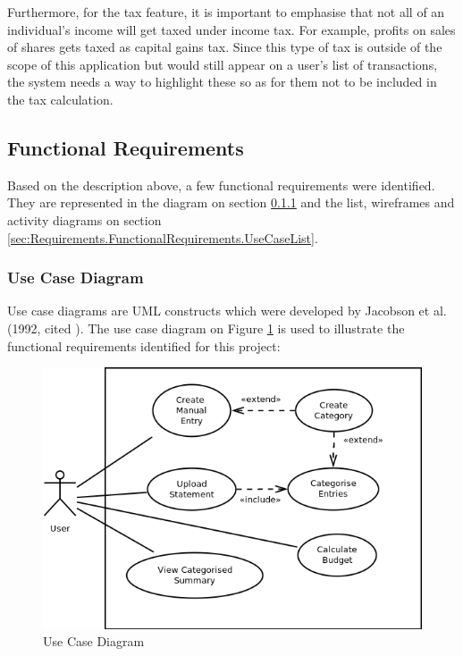 Furthermore, for the tax feature, it is important to emphasise that not all of
an individual's income will get taxed under income tax. For example, profits on
sales of shares gets taxed as capital gains tax. Since this type of tax is
outside of the scope of this application but would still appear on a user's
list of transactions, the system needs a way to highlight these so as for them
not to be included in the tax calculation.


\subsection{Functional Requirements} \label{sec:Requirements.FunctionalRequirements}

Based on the description above, a few functional requirements were identified.
They are represented in the diagram on section
\ref{sec:Requirements.FunctionalRequirements.UseCaseDiagram} and the list,
wireframes and activity diagrams on section
\ref{sec:Requirements.FunctionalRequirements.UseCaseList}.

\subsubsection{Use Case Diagram} \label{sec:Requirements.FunctionalRequirements.UseCaseDiagram}
Use case diagrams are UML constructs which were developed by Jacobson et al.
(1992, cited \cite[][p.~154]{bennett2010object}). The use case diagram on
Figure \ref{fig:UseCaseDiagram} is used to illustrate the functional
requirements identified for this project:
\begin{figure}[ht!]
  \begin{center}
    \includegraphics[width=14cm]{./contents/img/Use_Case_Diagram.png}
  \end{center}
  \caption{Use Case Diagram}
  \label{fig:UseCaseDiagram}
\end{figure}
\FloatBarrier



